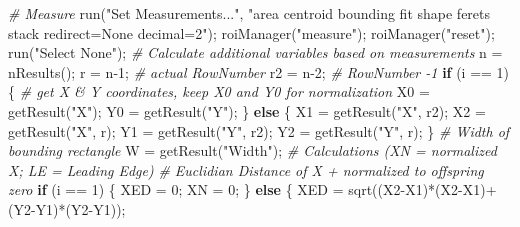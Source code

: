 \documentclass[10pt, b5paper, singlespacinge, twoside]{reedthesis} %
\newenvironment{Shaded}{}{}
\newcommand{\CommentTok}[1]{\textit{#1}}
\newcommand{\ControlFlowTok}[1]{\textbf{#1}}
\newcommand{\DecValTok}[1]{#1}
\newcommand{\FunctionTok}[1]{#1}
\newcommand{\NormalTok}[1]{#1}
\newcommand{\OtherTok}[1]{#1}
\newcommand{\SpecialCharTok}[1]{#1}
\newcommand{\StringTok}[1]{#1}
\theoremstyle{definition}
\theoremstyle{definition}
\theoremstyle{definition}
\theoremstyle{remark}
\begin{document}
\begin{Shaded}
\begin{Highlighting}[numbers=left,,]
     \CommentTok{\# Measure}
        \FunctionTok{run}\NormalTok{(}\StringTok{"Set Measurements..."}\NormalTok{, }\StringTok{"area centroid bounding fit shape feret\textquotesingle{}s stack redirect=None decimal=2"}\NormalTok{);}
        \FunctionTok{roiManager}\NormalTok{(}\StringTok{"measure"}\NormalTok{);}
        \FunctionTok{roiManager}\NormalTok{(}\StringTok{"reset"}\NormalTok{);}
        \FunctionTok{run}\NormalTok{(}\StringTok{"Select None"}\NormalTok{);}
    \CommentTok{\# Calculate additional variables based on measurements}
\NormalTok{        n }\OtherTok{=} \FunctionTok{nResults}\NormalTok{();}
\NormalTok{        r }\OtherTok{=}\NormalTok{ n}\DecValTok{{-}1}\NormalTok{;  }\CommentTok{\# actual RowNumber}
\NormalTok{        r2 }\OtherTok{=}\NormalTok{ n}\DecValTok{{-}2}\NormalTok{; }\CommentTok{\# RowNumber {-}1}
        \ControlFlowTok{if}\NormalTok{ (i }\SpecialCharTok{==} \DecValTok{1}\NormalTok{) \{  }\CommentTok{\# get X \& Y coordinates, keep X0 and Y0 for normalization}
\NormalTok{            X0 }\OtherTok{=} \FunctionTok{getResult}\NormalTok{(}\StringTok{"X"}\NormalTok{);}
\NormalTok{            Y0 }\OtherTok{=} \FunctionTok{getResult}\NormalTok{(}\StringTok{"Y"}\NormalTok{);}
\NormalTok{        \} }\ControlFlowTok{else}\NormalTok{ \{}
\NormalTok{            X1 }\OtherTok{=} \FunctionTok{getResult}\NormalTok{(}\StringTok{"X"}\NormalTok{, r2);}
\NormalTok{            X2 }\OtherTok{=} \FunctionTok{getResult}\NormalTok{(}\StringTok{"X"}\NormalTok{, r);}
\NormalTok{            Y1 }\OtherTok{=} \FunctionTok{getResult}\NormalTok{(}\StringTok{"Y"}\NormalTok{, r2);}
\NormalTok{            Y2 }\OtherTok{=} \FunctionTok{getResult}\NormalTok{(}\StringTok{"Y"}\NormalTok{, r); }
\NormalTok{        \}}
    \CommentTok{\# Width of bounding rectangle}
\NormalTok{        W }\OtherTok{=} \FunctionTok{getResult}\NormalTok{(}\StringTok{"Width"}\NormalTok{);}
    \CommentTok{\# Calculations (XN = normalized X; LE = Leading Edge)}
    \CommentTok{\# Euclidian Distance of X + normalized to offspring \textquotesingle{}zero\textquotesingle{}}
        \ControlFlowTok{if}\NormalTok{ (i }\SpecialCharTok{==} \DecValTok{1}\NormalTok{) \{}
\NormalTok{            XED }\OtherTok{=} \DecValTok{0}\NormalTok{;}
\NormalTok{            XN }\OtherTok{=} \DecValTok{0}\NormalTok{;}
\NormalTok{        \} }\ControlFlowTok{else}\NormalTok{ \{}
\NormalTok{            XED }\OtherTok{=} \FunctionTok{sqrt}\NormalTok{((X2}\SpecialCharTok{{-}}\NormalTok{X1)}\SpecialCharTok{*}\NormalTok{(X2}\SpecialCharTok{{-}}\NormalTok{X1)}\SpecialCharTok{+}\NormalTok{(Y2}\SpecialCharTok{{-}}\NormalTok{Y1)}\SpecialCharTok{*}\NormalTok{(Y2}\SpecialCharTok{{-}}\NormalTok{Y1));}

\end{Highlighting}
\end{Shaded}
\end{document}
